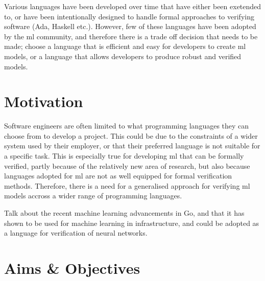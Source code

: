 Various languages have been developed over time that have either been exetended to, or have been intentionally designed to handle formal
approaches to verifying software (Ada, Haskell etc.). However, few of these languages have been adopted by the \gls{ml} community, and therefore
there is a trade off decision that needs to be made; choose a language that is efficient and easy for developers to create \gls{ml} models,
or a language that allows developers to produce robust and verified models.



\section{Motivation}


Software engineers are often limited to what programming languages they can choose from to develop a project. This could be
due to the constraints of a wider system used by their employer, or that their preferred language is not suitable for 
a specific task. This is especially true for developing \gls{ml} that can be formally verified, partly because of the relatively
new area of research, but also because languages adopted for \gls{ml} are not as well equipped for formal verification methods. Therefore, there is a need
for a generalised approach for verifying \gls{ml} models accross a wider range of programming languages.

Talk about the recent machine learning advancements in Go, and that it has shown to be used for machine learning in infrastructure, and could be 
adopted as a language for verification of neural networks.

\section{Aims \& Objectives}
